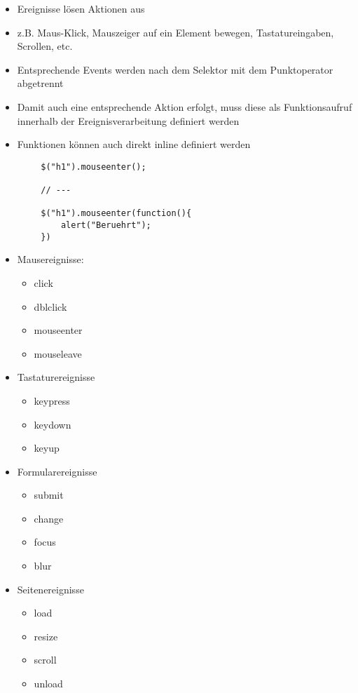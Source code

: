 \documentclass[10pt]{article}
\begin{document}
    \begin{tcolorbox}[
    colback=Red!5!white,
    colframe=Red!75!black,
    title={\centering Ereignisse/Aktionen}]
    \begin{itemize}
        \item Ereignisse lösen Aktionen aus
        \item z.B. Maus-Klick, Mauszeiger auf ein Element bewegen, Tastatureingaben, Scrollen, etc.
        \item Entsprechende Events werden nach dem Selektor mit dem Punktoperator abgetrennt
        \item Damit auch eine entsprechende Aktion erfolgt, muss diese als Funktionsaufruf innerhalb der Ereignisverarbeitung definiert werden
        \item Funktionen können auch direkt inline definiert werden
    \end{itemize}
    \begin{lstlisting}
        $("h1").mouseenter();

        // ---

        $("h1").mouseenter(function(){
            alert("Beruehrt");
        })
    \end{lstlisting}
    \begin{itemize}
        \item Mausereignisse:
        \begin{itemize}
            \item click
            \item dblclick
            \item mouseenter
            \item mouseleave
        \end{itemize}
        \item Tastaturereignisse
        \begin{itemize}
            \item keypress
            \item keydown
            \item keyup
        \end{itemize}
        \item Formularereignisse
        \begin{itemize}
            \item submit
            \item change
            \item focus
            \item blur
        \end{itemize}
        \item Seitenereignisse
        \begin{itemize}
            \item load
            \item resize
            \item scroll 
            \item unload
        \end{itemize}
    \end{itemize}
    \end{tcolorbox}
\end{document}
